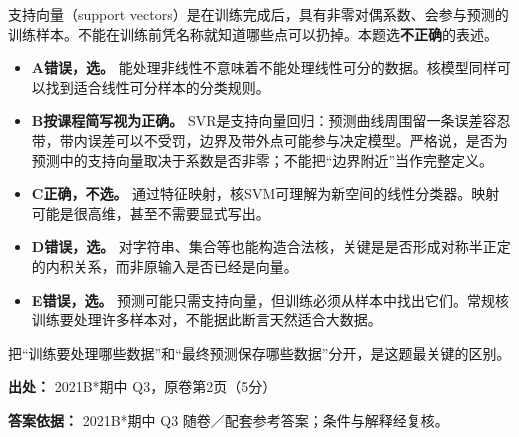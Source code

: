 支持向量（support vectors）是在训练完成后，具有非零对偶系数、会参与预测的训练样本。不能在训练前凭名称就知道哪些点可以扔掉。本题选\textbf{不正确}的表述。



\begin{itemize}

\item \textbf{A错误，选。} 能处理非线性不意味着不能处理线性可分的数据。核模型同样可以找到适合线性可分样本的分类规则。

\item \textbf{B按课程简写视为正确。} SVR是支持向量回归：预测曲线周围留一条误差容忍带，带内误差可以不受罚，边界及带外点可能参与决定模型。严格说，是否为预测中的支持向量取决于系数是否非零；不能把“边界附近”当作完整定义。

\item \textbf{C正确，不选。} 通过特征映射，核SVM可理解为新空间的线性分类器。映射可能是很高维，甚至不需要显式写出。

\item \textbf{D错误，选。} 对字符串、集合等也能构造合法核，关键是是否形成对称半正定的内积关系，而非原输入是否已经是向量。

\item \textbf{E错误，选。} 预测可能只需支持向量，但训练必须从样本中找出它们。常规核训练要处理许多样本对，不能据此断言天然适合大数据。

\end{itemize}


把“训练要处理哪些数据”和“最终预测保存哪些数据”分开，是这题最关键的区别。


\textbf{出处：} 2021B*期中 Q3，原卷第2页（5分）


\textbf{答案依据：} 2021B*期中 Q3 随卷／配套参考答案；条件与解释经复核。
